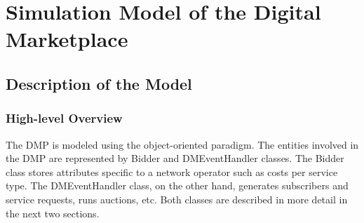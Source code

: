 \chapter{Simulation Model of the Digital Marketplace}
\label{cha:simulation_model_of_the_digital_marketplace}

\minitoc
\vspace{10mm}

\section{Description of the Model}
\label{sec:description_of_the_model_dmappendix}

\subsection{High-level Overview}
\label{sub:high_level_overview_dmappendix}
The DMP is modeled using the object-oriented paradigm. The entities involved in the DMP are represented by Bidder and DMEventHandler classes. The Bidder class stores attributes specific to a network operator such as costs per service type. The DMEventHandler class, on the other hand, generates subscribers and service requests, runs auctions, etc. Both classes are described in more detail in the next two sections.

